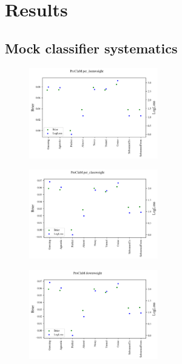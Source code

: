 \section{Results}
\label{sec:results}




\subsection{Mock classifier systematics}
\label{sec:mockresults}

\begin{figure}
	\begin{center}
		\includegraphics[width=0.5\textwidth]{./fig/multi_metric_per_item.png}
		\caption{}
		\label{fig:plasticc_per_item}
	\end{center}
\end{figure}

\begin{figure}
	\begin{center}
		\includegraphics[width=0.5\textwidth]{./fig/multi_metric_per_class.png}
		\caption{}
		\label{fig:plasticc_per_class}
	\end{center}
\end{figure}

\begin{figure}
	\begin{center}
		\includegraphics[width=0.5\textwidth]{./fig/multi_metric_down.png}
		\caption{}
		\label{fig:plasticc_down}
	\end{center}
\end{figure}


